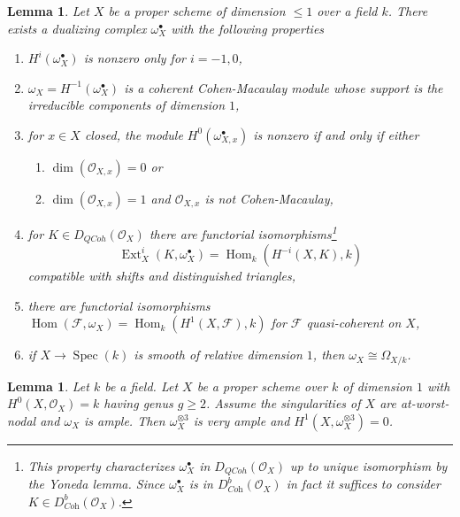 \documentclass{amsart}
\theoremstyle{plain}
\newtheorem{lemma}[subsection]{Lemma}
\theoremstyle{definition}
\theoremstyle{remark}
\numberwithin{equation}{subsection}
\def\Spec{\mathop{\mathrm{Spec}}}
\def\Hom{\mathop{\mathrm{Hom}}\nolimits}
\def\Ext{\mathop{\mathrm{Ext}}\nolimits}
\def\QCoh{\mathit{QCoh}}
\begin{document}
\begin{lemma}
\label{lemma-duality-dim-1}
Let $X$ be a proper scheme of dimension $\leq 1$ over a field $k$.
There exists a dualizing complex $\omega_X^\bullet$ with the
following properties
\begin{enumerate}
\item $H^i(\omega_X^\bullet)$ is nonzero only for $i = -1, 0$,
\item $\omega_X = H^{-1}(\omega_X^\bullet)$
is a coherent Cohen-Macaulay module whose support is the
irreducible components of dimension $1$,
\item for $x \in X$ closed, the module $H^0(\omega_{X, x}^\bullet)$
is nonzero if and only if either
\begin{enumerate}
\item $\dim(\mathcal{O}_{X, x}) = 0$ or
\item $\dim(\mathcal{O}_{X, x}) = 1$
and $\mathcal{O}_{X, x}$ is not Cohen-Macaulay,
\end{enumerate}
\item for $K \in D_\QCoh(\mathcal{O}_X)$ there are functorial
isomorphisms\footnote{This property
characterizes $\omega_X^\bullet$ in $D_\QCoh(\mathcal{O}_X)$
up to unique isomorphism by the Yoneda lemma. Since $\omega_X^\bullet$
is in $D^b_{\textit{Coh}}(\mathcal{O}_X)$ in fact it suffices to consider
$K \in D^b_{\textit{Coh}}(\mathcal{O}_X)$.}
$$
\Ext^i_X(K, \omega_X^\bullet) = \Hom_k(H^{-i}(X, K), k)
$$
compatible with shifts and distinguished triangles,
\item there are functorial isomorphisms
$\Hom(\mathcal{F}, \omega_X) = \Hom_k(H^1(X, \mathcal{F}), k)$
for $\mathcal{F}$ quasi-coherent on $X$,
\item if $X \to \Spec(k)$ is smooth of relative dimension $1$,
then $\omega_X \cong \Omega_{X/k}$.
\end{enumerate}
\end{lemma}

\begin{lemma}
\label{lemma-tricanonical}
Let $k$ be a field. Let $X$ be a proper scheme over $k$ of dimension $1$ with
$H^0(X, \mathcal{O}_X) = k$ having genus $g \geq 2$. Assume the singularities
of $X$ are at-worst-nodal and $\omega_X$ is ample. Then
$\omega_X^{\otimes 3}$ is very ample and $H^1(X, \omega_X^{\otimes 3}) = 0$.
\end{lemma}
\end{document}
